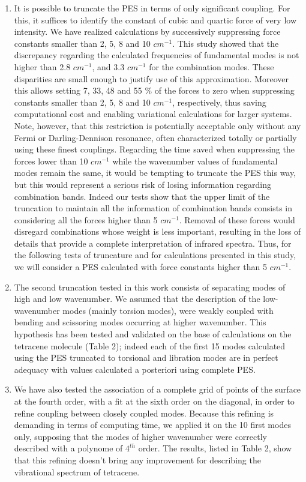 \begin{enumerate}
	\item It is possible to truncate the PES in terms of only significant coupling. For this, it suffices to identify the constant of cubic and quartic force of very low intensity. We have realized calculations by successively suppressing force constants smaller than 2, 5, 8 and 10 $cm^{-1}$.  This study showed that the discrepancy regarding the calculated frequencies of fundamental modes is not higher than 2.8 $cm^{-1}$, and 3.3 $cm^{-1}$ for the combination modes. These disparities are small enough to justify use of this approximation. Moreover this allows setting 7, 33, 48 and 55 \% of the forces to zero when suppressing constants smaller than 2, 5, 8 and 10 $cm^{-1}$, respectively, thus saving computational cost and enabling variational calculations for larger systems. Note, however, that this restriction is potentially acceptable only without any Fermi or Darling-Dennison resonance, often characterized totally or partially using these finest couplings. Regarding the time saved when suppressing the forces lower than 10 $cm^{-1}$ while the wavenumber values of fundamental modes remain the same, it would be tempting to truncate the PES this way, but this would represent a serious risk of losing information regarding combination bands. Indeed our tests show that the upper limit of the truncation to maintain all the information of combination bands consists in considering all the forces higher than 5 $cm^{-1}$. Removal of these forces would disregard combinations whose weight is less important, resulting in the loss of details that provide a complete interpretation of infrared spectra. Thus, for the following tests of truncature and for calculations presented in this study, we will consider a PES calculated with force constants higher than 5 $cm^{-1}$.
	
	\item The second truncation tested in this work consists of separating modes of high and low wavenumber. We assumed that the description of the low-wavenumber modes (mainly torsion modes), were weakly coupled with bending and scissoring modes occurring at higher wavenumber.  This hypothesis has been tested and validated on the base of calculations on the tetracene molecule (Table 2); indeed each of the first 15 modes calculated using the PES truncated to torsional and libration modes are in perfect adequacy with values calculated a posteriori using complete PES. 
	
	\item We have also tested the association of a complete grid of points of the surface at the fourth order, with a fit at the sixth order on the diagonal, in order to refine coupling between closely coupled modes. Because this refining is demanding in terms of computing time, we applied it on the 10 first modes only, supposing that the modes of higher wavenumber were correctly described with a polynome of $4^{th}$ order. The results, listed in Table 2, show that this refining doesn’t bring any improvement for describing the vibrational spectrum of tetracene.
	

\end{enumerate}
